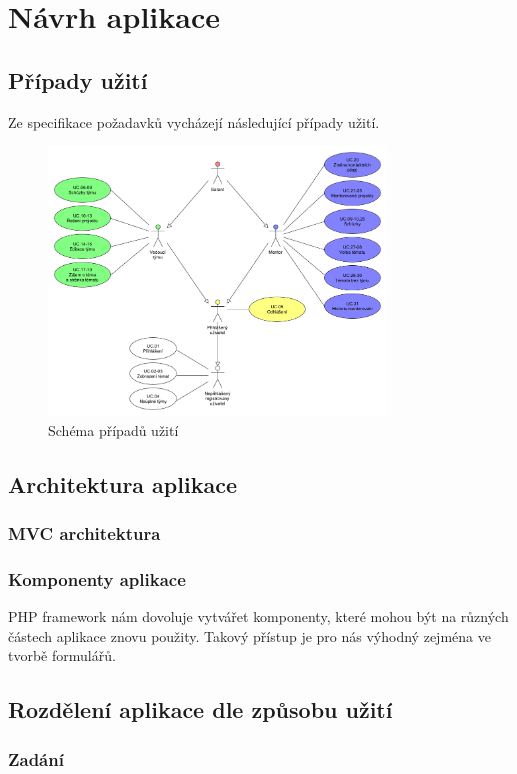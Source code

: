\documentclass[czech,BP]{thesiskiv}
\begin{document}
\chapter{Návrh aplikace}
	\section{Případy užití}
		Ze specifikace požadavků vycházejí následující případy užití.
		\begin{figure}[h]
			\centering
			\includegraphics[width=0.8\textwidth]{img/use_case/use_case_diagram}
			\caption{Schéma případů užití}
		\end{figure}
	\section{Architektura aplikace}
		\subsection{MVC architektura}
		\subsection{Komponenty aplikace}
		\par PHP framework nám dovoluje vytvářet komponenty, které mohou být na různých částech aplikace znovu použity. Takový přístup je pro nás výhodný zejména ve tvorbě formulářů.
	\section{Rozdělení aplikace dle způsobu užití}
		\subsection{Zadání}
			
\end{document}

